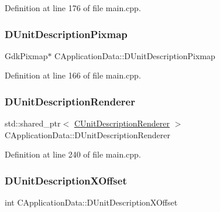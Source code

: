 Definition at line 176 of file main.\+cpp.

\hypertarget{classCApplicationData_a52e5c1a2ac452c82580ba3f4978c3501}{}\label{classCApplicationData_a52e5c1a2ac452c82580ba3f4978c3501} 
\subsubsection{\texorpdfstring{D\+Unit\+Description\+Pixmap}{DUnitDescriptionPixmap}}
{\footnotesize\ttfamily Gdk\+Pixmap$\ast$ C\+Application\+Data\+::\+D\+Unit\+Description\+Pixmap\hspace{0.3cm}{\ttfamily [protected]}}



Definition at line 166 of file main.\+cpp.

\hypertarget{classCApplicationData_a194301f34566fc497b032bdfcad55287}{}\label{classCApplicationData_a194301f34566fc497b032bdfcad55287} 
\subsubsection{\texorpdfstring{D\+Unit\+Description\+Renderer}{DUnitDescriptionRenderer}}
{\footnotesize\ttfamily std\+::shared\+\_\+ptr$<$ \hyperlink{classCUnitDescriptionRenderer}{C\+Unit\+Description\+Renderer} $>$ C\+Application\+Data\+::\+D\+Unit\+Description\+Renderer\hspace{0.3cm}{\ttfamily [protected]}}



Definition at line 240 of file main.\+cpp.

\hypertarget{classCApplicationData_a5653b5d0eff32ccd540ad60f5c331c24}{}\label{classCApplicationData_a5653b5d0eff32ccd540ad60f5c331c24} 
\subsubsection{\texorpdfstring{D\+Unit\+Description\+X\+Offset}{DUnitDescriptionXOffset}}
{\footnotesize\ttfamily int C\+Application\+Data\+::\+D\+Unit\+Description\+X\+Offset\hspace{0.3cm}{\ttfamily [protected]}}



